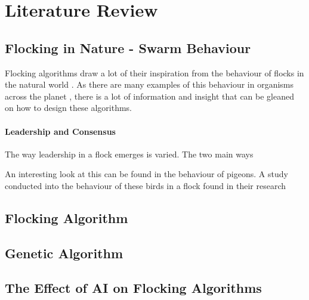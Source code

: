 

\section{Literature Review}

\subsection{Flocking in Nature - Swarm Behaviour}
Flocking algorithms draw a lot of their inspiration from the behaviour of flocks in the natural world \citep{flake1998computational}. As there are many examples of this behaviour in organisms across the planet \citep{Swarm: Nature's Incredible Invasions}%
, there is a lot of information and insight that can be gleaned on how to design these algorithms.


\paragraph{Leadership and Consensus}
The way leadership in a flock emerges is varied. The two main ways %

An interesting look at this can be found in the behaviour of pigeons. A study conducted into the behaviour of these birds in a flock \citep{Jorge2414} found in their research 

\subsection{Flocking Algorithm}


\subsection{Genetic Algorithm}


\subsection{The Effect of AI on Flocking Algorithms}
	